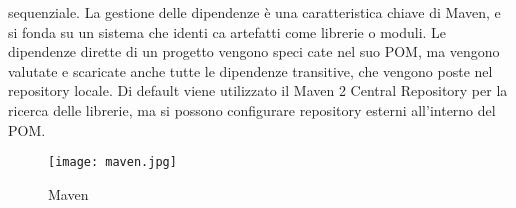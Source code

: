 sequenziale.
La gestione delle dipendenze \`e una caratteristica chiave di Maven, e si fonda su un sistema che identi ca artefatti come librerie o moduli.  Le dipendenze dirette di un progetto vengono speci cate nel suo POM, ma vengono valutate e scaricate anche tutte le dipendenze transitive, che vengono poste nel repository locale.  Di default viene utilizzato il Maven 2 Central Repository per la ricerca delle librerie,  ma si possono configurare repository esterni all'interno del POM.
\begin{figure}[!htb]
\centering%
\texttt{[image: maven.jpg]}%
\caption{Maven}\label{fig:maven}%
\end{figure}
